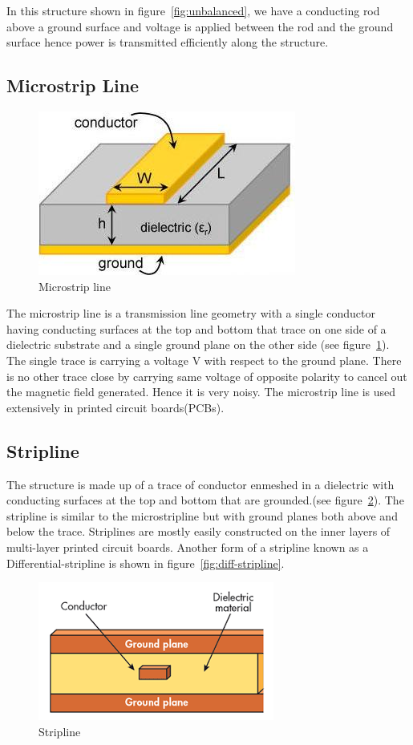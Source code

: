 In this structure shown in figure~\ref{fig:unbalanced}, we have a conducting rod above a ground surface and voltage is applied between the rod and the ground surface hence power is transmitted efficiently along the structure.

\subsection{Microstrip Line}
\begin{figure}[h]
\centering
\includegraphics[scale=0.6]{./graphics/ms (1)}
\caption{Microstrip line}
\label{fig:micro}
\end{figure}

The microstrip line is a transmission line geometry with a single conductor having conducting surfaces at the top and bottom that trace on one side of a dielectric substrate and a single ground plane on the other side (see figure~\ref{fig:micro}). The single trace is carrying a voltage V with respect to the ground plane. There is no other trace close by carrying same voltage of opposite polarity to cancel out the magnetic field generated. Hence it is very noisy. The microstrip line is used extensively in printed circuit boards(PCBs).

\subsection{Stripline} 
The structure is made up of a trace of conductor enmeshed in a dielectric with conducting surfaces at the top and bottom that are grounded.(see figure~\ref{fig:stripline}). The stripline is similar to the microstripline but with ground planes both above and below the trace. Striplines are mostly easily constructed on the inner layers of multi-layer printed circuit boards. Another form of a stripline known as a Differential-stripline is shown in figure~\ref{fig:diff-stripline}.
\begin{figure}[h]
\centering
\includegraphics[scale=0.6]{./graphics/micro}
\caption{Stripline}
\label{fig:stripline}
\end{figure}


